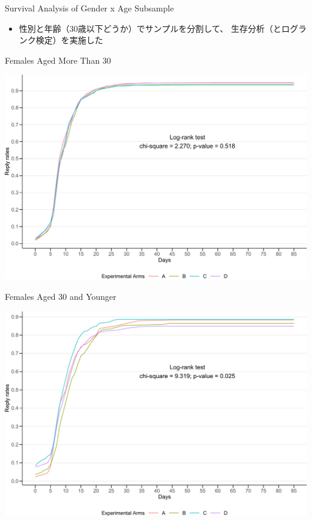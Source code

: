 \documentclass[
      aspectratio=169,
        12pt,
    ]{beamer}
\providecommand{\tightlist}{%
  \setlength{\itemsep}{0pt}\setlength{\parskip}{0pt}}
\begin{document}
\begin{frame}{Survival Analysis of Gender x Age Subsample}
\protect\hypertarget{survival-analysis-of-gender-x-age-subsample}{}
\begin{itemize}
\tightlist
\item
  性別と年齢（30歳以下どうか）でサンプルを分割して、
  生存分析（とログランク検定）を実施した
\end{itemize}
\end{frame}

\begin{frame}{Females Aged More Than 30}
\protect\hypertarget{females-aged-more-than-30}{}
\begin{center}\includegraphics[width=0.75\linewidth]{report_files/figure-beamer/plot-surv-female-over30-1} \end{center}
\end{frame}

\begin{frame}{Females Aged 30 and Younger}
\protect\hypertarget{females-aged-30-and-younger}{}
\begin{center}\includegraphics[width=0.75\linewidth]{report_files/figure-beamer/plot-surv-female-less30-1} \end{center}
\end{frame}
\end{document}

